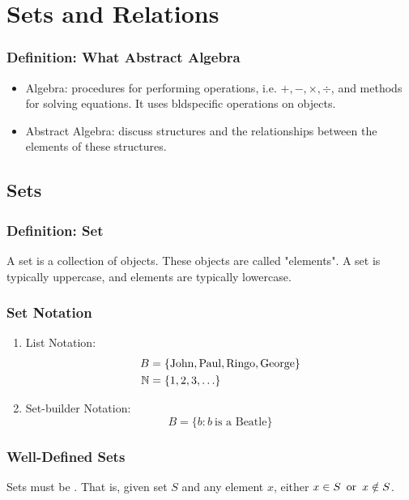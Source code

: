 \section{Sets and Relations}

\subsubsection*{Definition: What  Abstract Algebra}
\begin{itemize}
    \item Algebra: procedures for performing operations, i.e. $+,-,\times,\div$, and methods for solving equations. It uses bld{specific} operations on  objects.
    \item Abstract Algebra: discuss  structures and the relationships between the elements of these structures.
\end{itemize}

\subsection{Sets}

\subsubsection*{Definition: Set}
A set is a collection of objects. These objects are called "elements". A set is typically uppercase, and elements are typically lowercase.

\subsubsection*{Set Notation}
\begin{enumerate}
    \item List Notation:
    \begin{align*}
        B & = \{\text{John}, \text{Paul}, \text{Ringo}, \text{George}\} \\
        \mathbb{N} & = \{1,2,3,\ldots\}
    \end{align*}
    \item Set-builder Notation:
    \[
        B = \{b : b ~\text{is a Beatle}\}
    \]
\end{enumerate}

\subsubsection*{Well-Defined Sets}
Sets must be . That is, given set $S$ and any element $x$, either $x \in S \operatorname{~\text{or}~} x \notin S$.

